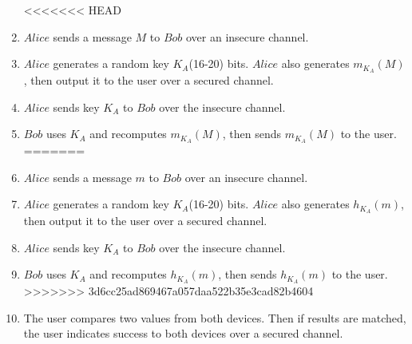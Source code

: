 \begin{enumerate}
<<<<<<< HEAD
\item $Alice$ sends a message $M$ to $Bob$ over an insecure channel. 
\item $Alice$ generates a random key $K_A$(16-20) bits. $Alice$ also generates $m_{K_A}(M)$, then output it to the user over a secured channel. 
\item $Alice$ sends key $K_A$ to $Bob$ over the insecure channel. 
\item $Bob$ uses $K_A$ and recomputes $m_{K_A}(M)$, then sends $m_{K_A}(M)$ to the user. 
=======
\item $Alice$ sends a message $m$ to $Bob$ over an insecure channel. 
\item $Alice$ generates a random key $K_A$(16-20) bits. $Alice$ also generates $h_{K_A}(m)$, then output it to the user over a secured channel. 
\item $Alice$ sends key $K_A$ to $Bob$ over the insecure channel. 
\item $Bob$ uses $K_A$ and recomputes $h_{K_A}(m)$, then sends $h_{K_A}(m)$ to the user. 
>>>>>>> 3d6cc25ad869467a057daa522b35e3cad82b4604
\item The user compares two values from both devices. Then if results are matched, the user indicates success to both devices over a secured channel. 
\end{enumerate}

\begin{center}
\end{center}



